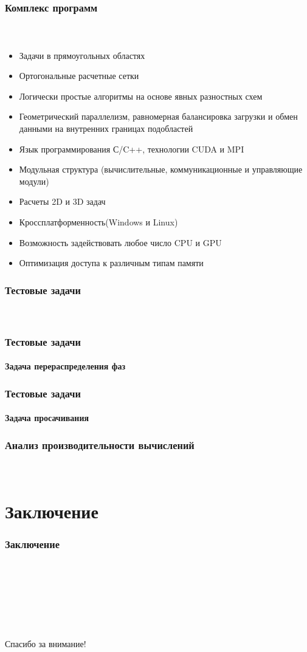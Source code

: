 \documentclass[10pt,pdf,hyperref={unicode}]{beamer} %
\begin{document}
\begin{frame}
\begin{center}
\frametitle{Комплекс программ}
\framesubtitle{\ }
\begin{itemize}
\item Задачи в прямоугольных областях
\item Ортогональные расчетные сетки
\item Логически простые алгоритмы на основе явных разностных схем
\item Геометрический параллелизм, равномерная балансировка загрузки и обмен данными на внутренних границах подобластей
\item Язык программирования С/C++, технологии CUDA и MPI
\item Модульная структура (вычислительные, коммуникационные и управляющие модули)
\item Расчеты 2D и 3D задач
\item Кроссплатформенность(Windows и Linux)
\item Возможность задействовать любое число CPU и GPU
\item Оптимизация доступа к различным типам памяти
\end{itemize}
\end{center}
\end{frame}

\begin{frame}
\begin{center}
\frametitle{Тестовые задачи}
\framesubtitle{\ }
\end{center}
\end{frame}

\begin{frame}
\frametitle{Тестовые задачи}
\framesubtitle{Задача перераспределения фаз}
\begin{center}

\end{center}
\end{frame}


\begin{frame}
\frametitle{Тестовые задачи}
\framesubtitle{Задача просачивания}
\begin{center}

\end{center}
\end{frame}

\begin{frame}
\begin{center}
\frametitle{Анализ производительности вычислений}
\framesubtitle{\ }
\end{center}
\end{frame}

\section{Заключение}
\begin{frame}
\begin{center}
\frametitle{Заключение}
\framesubtitle{\ }
\end{center}
\end{frame}

\begin{frame}
\begin{center}
\frametitle{\ }
\framesubtitle{\ }
\item {\huge Спасибо за внимание!}
\end{center}
\end{frame}
\end{document}
